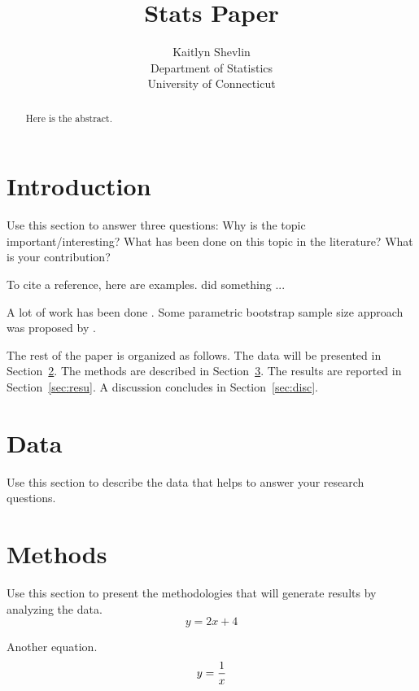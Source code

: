 \documentclass[12pt]{article}
\title{Stats Paper}
\author{Kaitlyn Shevlin\\
  Department of Statistics\\
  University of Connecticut
}
\begin{document}
\maketitle

\begin{abstract}
Here is the abstract.  
\end{abstract}


\section{Introduction}
\label{sec:intro}

Use this section to answer three questions:
Why is the topic important/interesting?
What has been done on this topic in the literature?
What is your contribution?

\lipsum[1-3]

To cite a reference, here are examples.
\citet{xie2015dynamic} did something ... \lipsum[1]

A lot of work has been done \citep[e.g.,][]{xie2015dynamic}.
\lipsum[2]
Some parametric bootstrap sample size approach was proposed by
\citet{dwivedi2017analysis}. 


The rest of the paper is organized as follows.
The data will be presented in Section~\ref{sec:data}.
The methods are described in Section~\ref{sec:meth}.
The results are reported in Section~\ref{sec:resu}.
A discussion concludes in Section~\ref{sec:disc}.


\section{Data}
\label{sec:data}

Use this section to describe the data that helps to answer your research questions.

\section{Methods}
\label{sec:meth}

Use this section to present the methodologies that will generate results by
analyzing the data.
\begin{equation}
  \label{eq:line}
  y = 2x + 4 
\end{equation}

Another equation.
\begin{equation}
  \label{eq:line}
y = {1\over\displaystyle x}
\end{equation}
\end{document}
